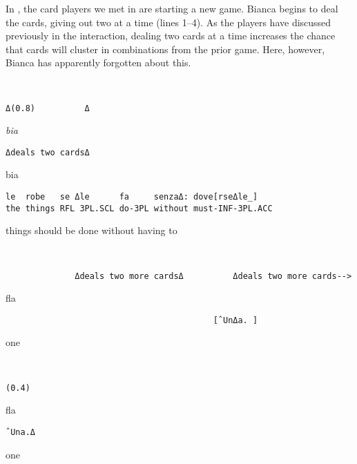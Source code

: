 \documentclass[output=paper,modfonts]{langscibook}
\begin{document}
In , the card players we met in  are starting a new game. Bianca begins to deal the cards, giving out two at a time (lines 1--4). As the players have discussed previously in the interaction, dealing two cards at a time increases the chance that cards will cluster in combinations from the prior game. Here, however, Bianca has apparently forgotten about this. 

\vspace{2mm}
%
\begin{transbox}{1}{~}
\begin{verbatim}
Δ(0.8)          Δ              
\end{verbatim}
\end{transbox}
%
\begin{transbox}{2}{\textit{bia}}
\begin{verbatim}
Δdeals two cardsΔ
\end{verbatim}
\end{transbox}
%
\begin{transbox}{3}{bia}
\begin{verbatim}
le  robe   se Δle      fa     senzaΔ: dove[rseΔle_]
the things RFL 3PL.SCL do-3PL without must-INF-3PL.ACC
\end{verbatim}
things should be done without having to
\end{transbox}\vspace{1mm}
%
\begin{transbox}{4}{~}
\begin{verbatim}
              Δdeals two more cardsΔ          Δdeals two more cards-->
\end{verbatim}
\end{transbox}
%
\begin{mdframednoverticalspace}[style=firstfoc]
\begin{transbox}{5}{fla}
\begin{verbatim}
                                          [ˆUnΔa. ]
\end{verbatim}
\hspace{6.4cm} one
\end{transbox}
\end{mdframednoverticalspace}\vspace{-0.5mm}
%
\begin{transbox}{6}{~}
\begin{verbatim}
(0.4)
\end{verbatim}
\end{transbox}
%
\begin{mdframednoverticalspace}[style=firstfoc]
\begin{transbox}{7}{fla}
\begin{verbatim}
ˆUna.Δ
\end{verbatim}
one
\end{transbox}
\end{mdframednoverticalspace}\vspace{1.75mm}
\end{document}
